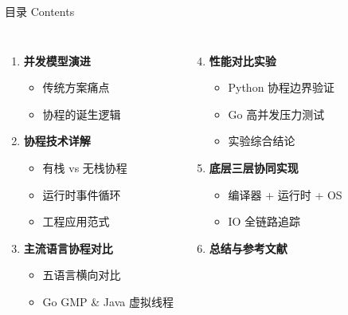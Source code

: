 \begin{frame}{目录 Contents}
  \vspace{0.5em}
  \begin{columns}[T]
    \begin{enumerate}
      \item \textbf{并发模型演进}
        \begin{itemize}
          \item 传统方案痛点
          \item 协程的诞生逻辑
        \end{itemize}
      \item \textbf{协程技术详解}
        \begin{itemize}
          \item 有栈 vs 无栈协程
          \item 运行时事件循环
          \item 工程应用范式
        \end{itemize}
      \item \textbf{主流语言协程对比}
        \begin{itemize}
          \item 五语言横向对比
          \item Go GMP \& Java 虚拟线程
        \end{itemize}
    \end{enumerate}
    \begin{enumerate}
      \setcounter{enumi}{3}
      \item \textbf{性能对比实验}
        \begin{itemize}
          \item Python 协程边界验证
          \item Go 高并发压力测试
          \item 实验综合结论
        \end{itemize}
      \item \textbf{底层三层协同实现}
        \begin{itemize}
          \item 编译器 + 运行时 + OS
          \item IO 全链路追踪
        \end{itemize}
      \item \textbf{总结与参考文献}
    \end{enumerate}
  \end{columns}
\end{frame}

